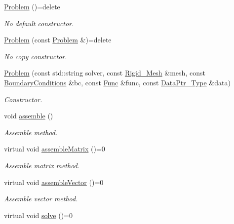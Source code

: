 \begin{DoxyCompactItemize}
\item 
\hyperlink{classFVCode3D_1_1Problem_a80413b277179c79d94f674440c961a90}{Problem} ()=delete
\begin{DoxyCompactList}\small\item\em No default constructor. \end{DoxyCompactList}\item 
\hyperlink{classFVCode3D_1_1Problem_afcdedf2e65ec84af7d1ee4529d7ef83f}{Problem} (const \hyperlink{classFVCode3D_1_1Problem}{Problem} \&)=delete
\begin{DoxyCompactList}\small\item\em No copy constructor. \end{DoxyCompactList}\item 
\hyperlink{classFVCode3D_1_1Problem_aa49ce9d7eb2b6b177d59cd989a9e9344}{Problem} (const std\+::string solver, const \hyperlink{classFVCode3D_1_1Rigid__Mesh}{Rigid\+\_\+\+Mesh} \&mesh, const \hyperlink{classFVCode3D_1_1BoundaryConditions}{Boundary\+Conditions} \&bc, const \hyperlink{namespaceFVCode3D_a38fa3b2520ad364d2c3d56ea5077826a}{Func} \&func, const \hyperlink{namespaceFVCode3D_a3d19a370a98afe491a9e17a646a9c56f}{Data\+Ptr\+\_\+\+Type} \&data)
\begin{DoxyCompactList}\small\item\em Constructor. \end{DoxyCompactList}\item 
void \hyperlink{classFVCode3D_1_1Problem_aa3f0a44084a56374f5ac7f242e0e45f7}{assemble} ()
\begin{DoxyCompactList}\small\item\em Assemble method. \end{DoxyCompactList}\item 
virtual void \hyperlink{classFVCode3D_1_1Problem_aea78fa4b5f2c4231fdc1a19a9eb8e4d4}{assemble\+Matrix} ()=0
\begin{DoxyCompactList}\small\item\em Assemble matrix method. \end{DoxyCompactList}\item 
virtual void \hyperlink{classFVCode3D_1_1Problem_a65afac2ca3bf78e5918461d41b972495}{assemble\+Vector} ()=0
\begin{DoxyCompactList}\small\item\em Assemble vector method. \end{DoxyCompactList}\item 
virtual void \hyperlink{classFVCode3D_1_1Problem_a7ee30db5a251dc7a9778c821e49cf376}{solve} ()=0

\end{DoxyCompactItemize}
